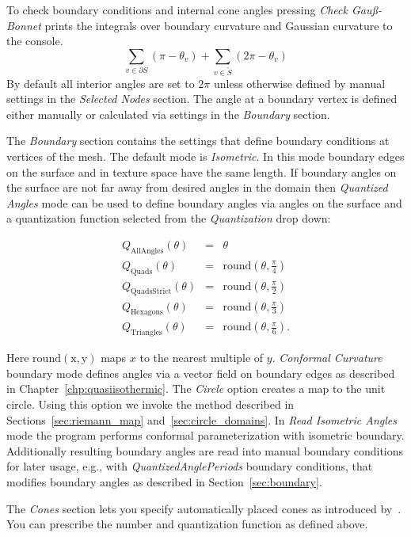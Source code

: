 \documentclass[Thesis.tex]{subfiles}
\begin{document}
To check boundary conditions and internal cone angles pressing \emph{Check Gau\ss-Bonnet} prints the integrals over boundary curvature and Gaussian curvature to the console. 
\[\sum_{v \in \partial S} \left(\pi - \theta_v\right) + \sum_{v \in \mathring{S}}\left(2\pi - \theta_v\right)\]
By default all interior angles are set to $2\pi$ unless otherwise defined by manual settings in the \emph{Selected Nodes} section. The angle at a boundary vertex is defined either manually or calculated via settings in the \emph{Boundary} section.

The \emph{Boundary} section contains the settings that define boundary conditions at vertices of the mesh. 
The default mode is \emph{Isometric}. In this mode boundary edges on the surface and in texture space have the same length. If boundary angles on the surface are not far away from desired angles in the domain then \emph{Quantized Angles} mode can be used to define boundary angles via angles on the surface and a quantization function selected from the \emph{Quantization} drop down:

\begin{eqnarray*}
	Q_{\mathrm{AllAngles}}(\theta) &=& \theta \\
	Q_{\mathrm{Quads}}(\theta) &=& \mathrm{round}\left(\theta, \frac{\pi}{4}\right) \\
	Q_{\mathrm{QuadsStrict}}(\theta) &=& \mathrm{round}\left(\theta, \frac{\pi}{2}\right) \\
	Q_{\mathrm{Hexagons}}(\theta) &=& \mathrm{round}\left(\theta, \frac{\pi}{3}\right) \\
	Q_{\mathrm{Triangles}}(\theta) &=& \mathrm{round}\left(\theta, \frac{\pi}{6}\right).
\end{eqnarray*}

Here $\mathrm{round(x,y)}$ maps $x$ to the nearest multiple of $y$.
\emph{Conformal Curvature} boundary mode defines angles via a vector field on boundary edges as described in Chapter~\ref{chp:quasiisothermic}. 
The \emph{Circle} option creates a map to the unit circle. 
Using this option we invoke the method described in Sections~\ref{sec:riemann_map} and~\ref{sec:circle_domains}. 
In \emph{Read Isometric Angles} mode the program performs conformal parameterization with isometric boundary. 
Additionally resulting boundary angles are read into manual boundary conditions for later usage, e.g., with \emph{QuantizedAnglePeriods} boundary conditions, that modifies boundary angles as described in Section~\ref{sec:boundary}.

The \emph{Cones} section lets you specify automatically placed cones as introduced by~\cite{Springborn2008}. You can prescribe the number and quantization function as defined above.
\end{document}
